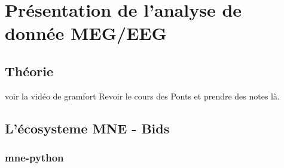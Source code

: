 \chapter{Présentation de l'analyse de donnée MEG/EEG}

\section{Théorie}

voir la vidéo de gramfort
Revoir le cours des Ponts et prendre des notes là.

\section{L'écosysteme MNE - Bids}


\subsection{mne-python}

\subsection{}